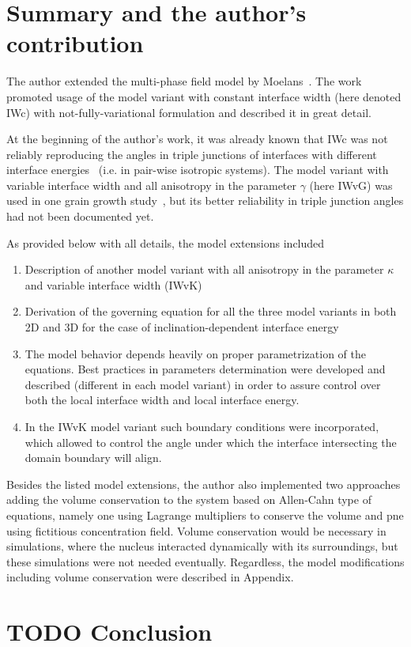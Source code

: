\section{Summary and the author's contribution}
The author extended the multi-phase field model by Moelans~\cite{Moelans2008}. The work~\cite{Moelans2008} promoted usage of the model variant with constant interface width (here denoted IWc) with not-fully-variational formulation and described it in great detail.

At the beginning of the author's work, it was already known that IWc was not reliably reproducing the angles in triple junctions of interfaces with different interface energies~\cite{Moelans2010_thinfilm} (i.e. in pair-wise isotropic systems). The model variant with variable interface width and all anisotropy in the parameter $\gamma$ (here IWvG) was used in one grain growth study~\cite{Ravash2017}, but its better reliability in triple junction angles had not been documented yet.

As provided below with all details, the model extensions included
\begin{enumerate}
	\item Description of another model variant with all anisotropy in the parameter $\kappa$ and variable interface width (IWvK)
	\item Derivation of the governing equation for all the three model variants in both 2D and 3D for the case of inclination-dependent interface energy
	\item The model behavior depends heavily on proper parametrization of the equations. Best practices in parameters determination were  developed and described (different in each model variant) in order to assure control over both the local interface width and local interface energy. 
	\item In the IWvK model variant such boundary conditions were incorporated, which allowed to control the angle under which the interface intersecting the domain boundary will align.
\end{enumerate}

Besides the listed model extensions, the author also implemented two approaches adding the volume conservation to the system based on Allen-Cahn type of equations, namely one using Lagrange multipliers to conserve the volume and pne using fictitious concentration field. Volume conservation would be necessary in simulations, where the nucleus interacted dynamically with its surroundings, but these simulations were not needed eventually. Regardless, the model modifications including volume conservation were described in Appendix.

\section{TODO Conclusion}
 

\cleardoublepage

